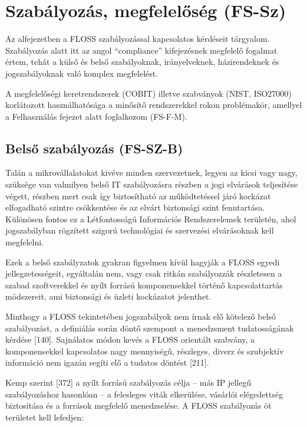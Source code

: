 \documentclass[12pt,magyar,a4paper,oneside]{scrreprt}
\begin{document}
\hypertarget{sec:FS-SZ}{%
\section{Szabályozás, megfelelőség (FS-Sz)}\label{sec:FS-SZ}}

Az alfejezetben a FLOSS szabályozással kapcsolatos kérdéseit tárgyalom.
Szabályozás alatt itt az angol ``compliance'' kifejezésnek megfelelő
fogalmat értem, tehát a külső és belső szabályoknak, irányelveknek,
házirendeknek és jogszabályoknak való komplex megfelelést.

A megfelelőségi keretrendszerek (COBIT) illetve szabványok (NIST,
ISO27000) korlátozott használhatósága a minősítő rendszerekkel rokon
problémakör, amellyel a Felhasználás fejezet alatt foglalkozom (FS-F-M).

\hypertarget{sec:FS-SZ-B}{%
\subsection{Belső szabályozás (FS-SZ-B)}\label{sec:FS-SZ-B}}

Talán a mikrovállalatokat kivéve minden szervezetnek, legyen az kicsi
vagy nagy, szüksége van valmilyen belső IT szabályozásra részben a jogi
elvárások teljesítése végett, részben mert csak így biztosítható az
működtetéssel járó kockázat elfogadható szintre csökkentése és az elvárt
biztonsági szint fenntartása. Különösen fontos ez a Létfontosságú
Információs Rendszerelemek területén, ahol jogszabályban rögzített
szigorú technológiai és szervezési elvárásoknak kell megfelelni.

Ezek a belső szabályzatok gyakran figyelmen kívül hagyják a FLOSS egyedi
jellegzetességeit, egyáltalán nem, vagy csak ritkán szabályozzák
részletesen a szabad szoftverekkel és nyílt forrású komponensekkel
történő kapcsolattartás módszereit, ami biztonsági és üzleti kockázatot
jelenthet.

Minthogy a FLOSS tekintetében jogszabályok nem írnak elő kötelező belső
szabályozást, a definiálás során döntő szempont a menedzsment
tudatosságának kérdése {[}140{]}. Sajnálatos módon kevés a FLOSS
orientált szabvány, a komponensekkel kapcsolatos nagy mennyiségű,
részleges, diverz és szubjektív információ nem igazán segíti elő a
tudatos döntést {[}211{]}.

Kemp szerint {[}372{]} a nyílt forrású szabályozás célja -- más IP
jellegű szabályozáshoz hasonlóan -- a felesleges viták elkerülése,
vásárlói elégedettség biztosítása és a források megfelelő menedzselése.
A FLOSS szabályozás öt területet kell lefedjen:
\end{document}
